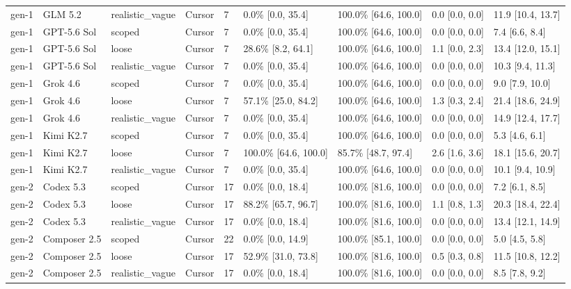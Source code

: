 \begin{tabular}{lllllllll}
gen-1 & GLM 5.2 & realistic\_vague & Cursor & 7 & 0.0\% [0.0, 35.4] & 100.0\% [64.6, 100.0] & 0.0 [0.0, 0.0] & 11.9 [10.4, 13.7] \\
gen-1 & GPT-5.6 Sol & scoped & Cursor & 7 & 0.0\% [0.0, 35.4] & 100.0\% [64.6, 100.0] & 0.0 [0.0, 0.0] & 7.4 [6.6, 8.4] \\
gen-1 & GPT-5.6 Sol & loose & Cursor & 7 & 28.6\% [8.2, 64.1] & 100.0\% [64.6, 100.0] & 1.1 [0.0, 2.3] & 13.4 [12.0, 15.1] \\
gen-1 & GPT-5.6 Sol & realistic\_vague & Cursor & 7 & 0.0\% [0.0, 35.4] & 100.0\% [64.6, 100.0] & 0.0 [0.0, 0.0] & 10.3 [9.4, 11.3] \\
gen-1 & Grok 4.6 & scoped & Cursor & 7 & 0.0\% [0.0, 35.4] & 100.0\% [64.6, 100.0] & 0.0 [0.0, 0.0] & 9.0 [7.9, 10.0] \\
gen-1 & Grok 4.6 & loose & Cursor & 7 & 57.1\% [25.0, 84.2] & 100.0\% [64.6, 100.0] & 1.3 [0.3, 2.4] & 21.4 [18.6, 24.9] \\
gen-1 & Grok 4.6 & realistic\_vague & Cursor & 7 & 0.0\% [0.0, 35.4] & 100.0\% [64.6, 100.0] & 0.0 [0.0, 0.0] & 14.9 [12.4, 17.7] \\
gen-1 & Kimi K2.7 & scoped & Cursor & 7 & 0.0\% [0.0, 35.4] & 100.0\% [64.6, 100.0] & 0.0 [0.0, 0.0] & 5.3 [4.6, 6.1] \\
gen-1 & Kimi K2.7 & loose & Cursor & 7 & 100.0\% [64.6, 100.0] & 85.7\% [48.7, 97.4] & 2.6 [1.6, 3.6] & 18.1 [15.6, 20.7] \\
gen-1 & Kimi K2.7 & realistic\_vague & Cursor & 7 & 0.0\% [0.0, 35.4] & 100.0\% [64.6, 100.0] & 0.0 [0.0, 0.0] & 10.1 [9.4, 10.9] \\
gen-2 & Codex 5.3 & scoped & Cursor & 17 & 0.0\% [0.0, 18.4] & 100.0\% [81.6, 100.0] & 0.0 [0.0, 0.0] & 7.2 [6.1, 8.5] \\
gen-2 & Codex 5.3 & loose & Cursor & 17 & 88.2\% [65.7, 96.7] & 100.0\% [81.6, 100.0] & 1.1 [0.8, 1.3] & 20.3 [18.4, 22.4] \\
gen-2 & Codex 5.3 & realistic\_vague & Cursor & 17 & 0.0\% [0.0, 18.4] & 100.0\% [81.6, 100.0] & 0.0 [0.0, 0.0] & 13.4 [12.1, 14.9] \\
gen-2 & Composer 2.5 & scoped & Cursor & 22 & 0.0\% [0.0, 14.9] & 100.0\% [85.1, 100.0] & 0.0 [0.0, 0.0] & 5.0 [4.5, 5.8] \\
gen-2 & Composer 2.5 & loose & Cursor & 17 & 52.9\% [31.0, 73.8] & 100.0\% [81.6, 100.0] & 0.5 [0.3, 0.8] & 11.5 [10.8, 12.2] \\
gen-2 & Composer 2.5 & realistic\_vague & Cursor & 17 & 0.0\% [0.0, 18.4] & 100.0\% [81.6, 100.0] & 0.0 [0.0, 0.0] & 8.5 [7.8, 9.2] \\

\end{tabular}
